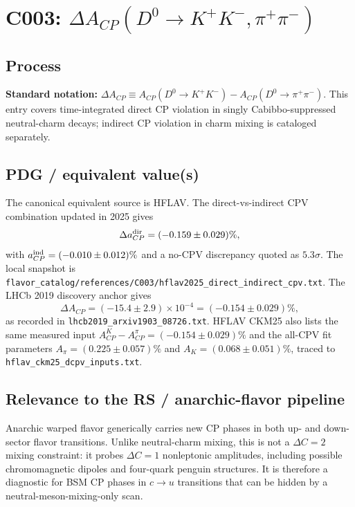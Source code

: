
\section{\texorpdfstring{C003: \(\Delta A_{CP}(D^0\to K^+K^-,\pi^+\pi^-)\)}{C003: Delta ACP in D0 -> KK, pi pi}}

\subsection*{Process}
\textbf{Standard notation:} \(\Delta A_{CP}\equiv
A_{CP}(D^0\to K^+K^-)-A_{CP}(D^0\to\pi^+\pi^-)\).  This entry covers
time-integrated direct CP violation in singly Cabibbo-suppressed neutral-charm
decays; indirect CP violation in charm mixing is cataloged separately.

\subsection*{PDG / equivalent value(s)}
The canonical equivalent source is HFLAV.  The direct-vs-indirect CPV
combination updated in 2025 gives
\[
  \Delta a_{CP}^{\rm dir}=(-0.159\pm0.029)\% ,
\]
with \(a_{CP}^{\rm ind}=(-0.010\pm0.012)\%\) and a no-CPV discrepancy quoted
as \(5.3\sigma\).  The local snapshot is
\texttt{flavor\_catalog/references/C003/hflav2025\_direct\_indirect\_cpv.txt}.
The LHCb 2019 discovery anchor gives
\[
  \Delta A_{CP}=(-15.4\pm2.9)\times10^{-4}=(-0.154\pm0.029)\% ,
\]
as recorded in \texttt{lhcb2019\_arxiv1903\_08726.txt}.  HFLAV CKM25 also
lists the same measured input \(A_{CP}^K-A_{CP}^{\pi}=(-0.154\pm0.029)\%\)
and the all-CPV fit parameters \(A_{\pi}=(0.225\pm0.057)\%\) and
\(A_K=(0.068\pm0.051)\%\), traced to
\texttt{hflav\_ckm25\_dcpv\_inputs.txt}.

\subsection*{Relevance to the RS / anarchic-flavor pipeline}
Anarchic warped flavor generically carries new CP phases in both up- and
down-sector flavor transitions.  Unlike neutral-charm mixing, this is not a \(\Delta C=2\)
mixing constraint: it probes \(\Delta C=1\) nonleptonic amplitudes, including
possible chromomagnetic dipoles and four-quark penguin structures.  It is
therefore a diagnostic for BSM CP phases in \(c\to u\) transitions that can be
hidden by a neutral-meson-mixing-only scan.

